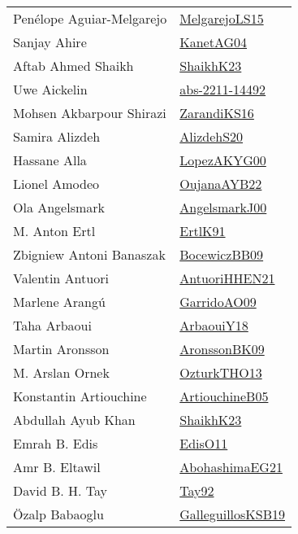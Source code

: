 {\begin{longtable}{p{4cm}p{20cm}}
Pen{\'{e}}lope Aguiar{-}Melgarejo & \href{papers/MelgarejoLS15.pdf}{MelgarejoLS15}\cite{MelgarejoLS15} \\
Sanjay Ahire & \href{}{KanetAG04}\cite{KanetAG04} \\
Aftab Ahmed Shaikh & \href{}{ShaikhK23}\cite{ShaikhK23} \\
Uwe Aickelin & \href{articles/abs-2211-14492.pdf}{abs-2211-14492}\cite{abs-2211-14492} \\
Mohsen Akbarpour Shirazi & \href{articles/ZarandiKS16.pdf}{ZarandiKS16}\cite{ZarandiKS16} \\
Samira Alizdeh & \href{}{AlizdehS20}\cite{AlizdehS20} \\
Hassane Alla & \href{articles/LopezAKYG00.pdf}{LopezAKYG00}\cite{LopezAKYG00} \\
Lionel Amodeo & \href{papers/OujanaAYB22.pdf}{OujanaAYB22}\cite{OujanaAYB22} \\
Ola Angelsmark & \href{papers/AngelsmarkJ00.pdf}{AngelsmarkJ00}\cite{AngelsmarkJ00} \\
M. Anton Ertl & \href{papers/ErtlK91.pdf}{ErtlK91}\cite{ErtlK91} \\
Zbigniew Antoni Banaszak & \href{}{BocewiczBB09}\cite{BocewiczBB09} \\
Valentin Antuori & \href{papers/AntuoriHHEN21.pdf}{AntuoriHHEN21}\cite{AntuoriHHEN21} \\
Marlene Arang{\'{u}} & \href{articles/GarridoAO09.pdf}{GarridoAO09}\cite{GarridoAO09} \\
Taha Arbaoui & \href{papers/ArbaouiY18.pdf}{ArbaouiY18}\cite{ArbaouiY18} \\
Martin Aronsson & \href{papers/AronssonBK09.pdf}{AronssonBK09}\cite{AronssonBK09} \\
M. Arslan Ornek & \href{articles/OzturkTHO13.pdf}{OzturkTHO13}\cite{OzturkTHO13} \\
Konstantin Artiouchine & \href{papers/ArtiouchineB05.pdf}{ArtiouchineB05}\cite{ArtiouchineB05} \\
Abdullah Ayub Khan & \href{}{ShaikhK23}\cite{ShaikhK23} \\
Emrah B. Edis & \href{papers/EdisO11.pdf}{EdisO11}\cite{EdisO11} \\
Amr B. Eltawil & \href{articles/AbohashimaEG21.pdf}{AbohashimaEG21}\cite{AbohashimaEG21} \\
David B. H. Tay & \href{}{Tay92}\cite{Tay92} \\
{\"{O}}zalp Babaoglu & \href{papers/GalleguillosKSB19.pdf}{GalleguillosKSB19}\cite{GalleguillosKSB19} \\

\end{longtable}}
